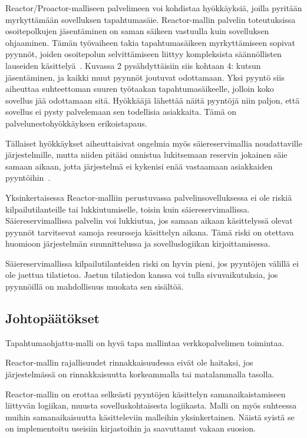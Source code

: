 \documentclass[finnish]{tktltiki2}
\theoremstyle{definition}
\theoremstyle{remark}
\begin{document}
Reactor/Proactor-malliseen palvelimeen voi kohdistaa hyökkäyksiä, joilla pyritään
myrkyttämään sovelluksen tapahtumasäie. Reactor-mallin palvelin toteutuksissa
osoitepolkujen jäsentäminen on saman säikeen vastuulla kuin sovelluksen ohjaaminen.
Tämän työvaiheen takia
tapahtumasäikeen myrkyttämiseen sopivat pyynnöt,
joiden osoitepolun selvittämiseen liittyy kompleksista
säännöllisten lauseiden käsittelyä~\cite{davis_case_2017}.
Kuvassa 2 pysähdyttäisiin siis kohtaan 4: kutsun jäsentäminen, ja
kaikki muut pyynnöt joutuvat odottamaan.
Yksi pyyntö siis aiheuttaa suhteettoman suuren työtaakan 
tapahtumasäikeelle, jolloin koko sovellus jää odottamaan sitä.
Hyökkääjä lähettää näitä pyyntöjä niin paljon, että sovellus 
ei pysty palvelemaan sen todellisia asiakkaita. Tämä
on palvelunestohyökkäyksen erikoistapaus.

Tällaiset hyökkäykset aiheuttaisivat ongelmia myös säiereservimallia
noudattaville järjestelmille, mutta niiden pitäisi onnistua
lukitsemaan reservin jokainen säie samaan aikaan, jotta
järjestelmä ei kykenisi enää vastaamaan asiakkaiden pyyntöihin~\cite{davis_case_2017}.

Yksinkertaisessa Reactor-malliin perustuvassa palvelinsovelluksessa ei ole 
riskiä kilpailutilanteille tai lukkiutumiselle, toisin kuin säiereservimallissa.
Säiereservimallissa palvelin voi lukkiutua, jos samaan aikaan käsittelyssä olevat
pyynnöt tarvitsevat samoja resursseja käsittelyn aikana. Tämä riski on otettava
huomioon järjestelmän suunnittelussa ja sovelluslogiikan kirjoittamisessa.

Säiereservimallissa kilpailutilanteiden riski on hyvin pieni, jos pyyntöjen
välillä ei ole jaettua tilatietoa. Jaetun tilatiedon kanssa voi tulla
sivuvaikutuksia, jos pyynnöillä on mahdollisuus muokata sen sisältöä.

\subsection{Johtopäätökset}

Tapahtumaohjattu-malli on hyvä tapa mallintaa verkkopalvelimen
toimintaa.

Reactor-mallin rajallisuudet rinnakkaisuudessa
eivät ole haitaksi, jos järjestelmässä on rinnakkaisuutta
korkeammalla tai matalammalla tasolla.

Reactor-mallin on erottaa
selkeästi pyyntöjen käsittelyn
samanaikaistamiseen liittyvän
logiikan, muusta sovelluskohtaisesta logiikasta.
Malli on myös suhteessa muihin samanaikaisuutta
käsitteleviin malleihin yksinkertainen.
Näistä syistä se on implementoitu useisiin
kirjastoihin ja saavuttanut vakaan suosion.
\end{document}
